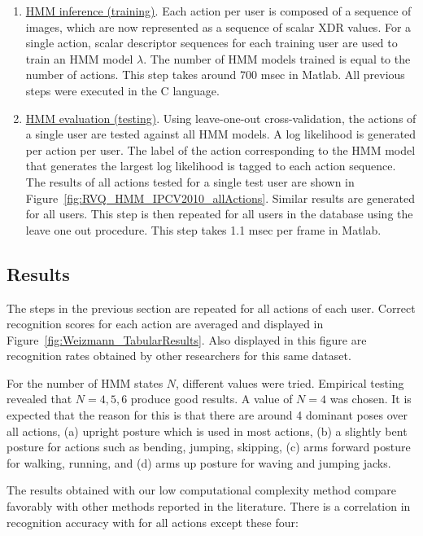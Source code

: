 \begin{enumerate}
\item \underline{HMM inference (training)}.  Each action per user is composed of a sequence of images, which are now represented as a sequence of scalar XDR values.  For a single action, scalar descriptor sequences for each training user are used to train an HMM model $\lambda$.  The number of HMM models trained is equal to the number of actions.  This step takes around 700 msec in Matlab.  All previous steps were executed in the C language.

\item \underline{HMM evaluation (testing)}.  Using leave-one-out cross-validation, the actions of a single user are tested against all HMM models.  A log likelihood is generated per action per user.  The label of the action corresponding to the HMM model that generates the largest log likelihood is tagged to each action sequence.  The results of all actions tested for a single test user are shown in Figure~\ref{fig:RVQ_HMM_IPCV2010_allActions}.  Similar results are generated for all users.  This step is then repeated for all users in the database using the leave one out procedure.  This step takes 1.1 msec per frame in Matlab.   
\end{enumerate}

\subsection{Results}
The steps in the previous section are repeated for all actions of each user.  Correct recognition scores for each action are averaged and displayed in Figure~\ref{fig:Weizmann_TabularResults}.  Also displayed in this figure are recognition rates obtained by other researchers for this same dataset.

For the number of HMM states $N$, different values were tried.  Empirical testing revealed that $N=4, 5, 6$ produce good results.  A value of $N=4$ was chosen.  It is expected that the reason for this is that there are around 4 dominant poses over all actions, (a) upright posture which is used in most actions, (b) a slightly bent posture for actions such as bending, jumping, skipping, (c) arms forward posture for walking, running, and (d) arms up posture for waving and jumping jacks.

The results obtained with our low computational complexity method compare favorably with other methods reported in the literature.  There is a correlation in recognition accuracy with \cite{2007_JNL_SpaceTimeShapes_Gorelick} for all actions except these four:  

